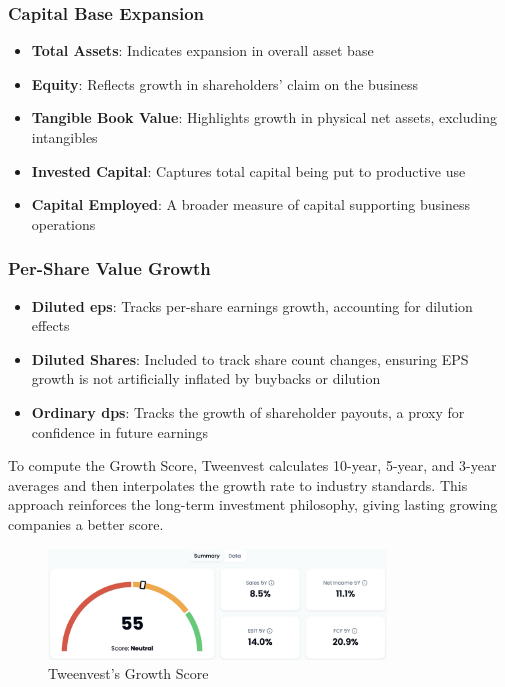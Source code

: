 \documentclass[11pt,english,a4paper,hidelinks]{book}
\begin{document}
\subsubsection{Capital Base Expansion}
\begin{itemize}
    \item \textbf{Total Assets}: Indicates expansion in overall asset base
    \item \textbf{Equity}: Reflects growth in shareholders' claim on the business
    \item \textbf{Tangible Book Value}: Highlights growth in physical net assets, excluding intangibles
    \item \textbf{Invested Capital}: Captures total capital being put to productive use
    \item \textbf{Capital Employed}: A broader measure of capital supporting business operations
\end{itemize}

\subsubsection{Per-Share Value Growth}
\begin{itemize}
    \item \textbf{Diluted \acrshort{eps}}: Tracks per-share earnings growth, accounting for dilution effects
    \item \textbf{Diluted Shares}: Included to track share count changes, ensuring EPS growth is not artificially inflated by buybacks or dilution
    \item \textbf{Ordinary \acrshort{dps}}: Tracks the growth of shareholder payouts, a proxy for confidence in future earnings
\end{itemize}

\vspace{0.5cm}
\noindent To compute the Growth Score, Tweenvest calculates 10-year, 5-year, and 3-year averages and then interpolates the growth rate to industry standards. This approach reinforces the long-term investment philosophy, giving lasting growing companies a better score.

\begin{figure}[H]
    \centering
    \includegraphics[width=0.8\textwidth]{images/tweenvest/growth score.png}
    \caption{Tweenvest's Growth Score}
    \label{fig:growth_score}
\end{figure}
\end{document}
